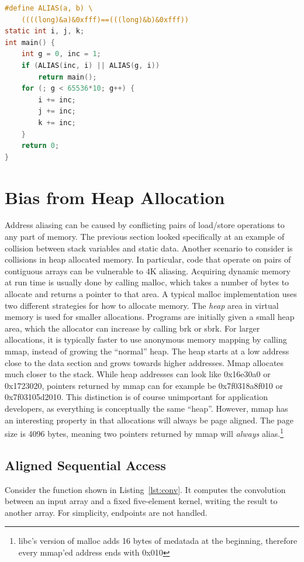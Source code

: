 \documentclass[a4paper,10pt,twocolumn,twoside]{article}
\begin{document}
\begin{lstlisting}[float=h, language=C, caption={Dynamically detect aliasing case, and avoid by pushing another stack frame.}, label={lst:loopfixed}, frame=lines]
#define ALIAS(a, b) \
    ((((long)&a)&0xfff)==(((long)&b)&0xfff))
static int i, j, k;
int main() {
    int g = 0, inc = 1;
    if (ALIAS(inc, i) || ALIAS(g, i))
        return main();
    for (; g < 65536*10; g++) {
        i += inc;
        j += inc;
        k += inc;
    }
    return 0;
}
\end{lstlisting}



\section{Bias from Heap Allocation}
Address aliasing can be caused by conflicting pairs of load/store operations to any part of memory.
The previous section looked specifically at an example of collision between stack variables and static data.
Another scenario to consider is collisions in heap allocated memory.
In particular, code that operate on pairs of contiguous arrays can be vulnerable to 4K aliasing.
Acquiring dynamic memory at run time is usually done by calling malloc, which takes a number of bytes to allocate and returns a pointer to that area.
A typical malloc implementation uses two different strategies for how to allocate memory.
The \emph{heap} area in virtual memory is used for smaller allocations.
Programs are initially given a small heap area, which the allocator can increase by calling brk or sbrk.
For larger allocations, it is typically faster to use anonymous memory mapping by calling mmap, instead of growing the ``normal'' heap.
The heap starts at a low address close to the data section and grows towards higher addresses. 
Mmap allocates much closer to the stack.
While heap addresses can look like 0x16e30a0 or 0x1723020, pointers returned by mmap can for example be 0x7f0318a8f010 or 0x7f03105d2010.
This distinction is of course unimportant for application developers, as everything is conceptually the same ``heap''.
However, mmap has an interesting property in that allocations will always be page aligned.
The page size is 4096 bytes, meaning two pointers returned by mmap will \emph{always} alias.\footnote{libc's version of malloc adds 16 bytes of medatada at the beginning, therefore every mmap'ed address ends with 0x010}

\subsection{Aligned Sequential Access}
Consider the function shown in Listing~\ref{lst:conv}.
It computes the convolution between an input array and a fixed five-element kernel, writing the result to another array.
For simplicity, endpoints are not handled.
\end{document}
